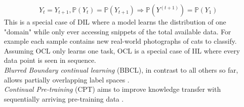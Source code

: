 \begin{equation}
	Y_t=Y_{t+1}, \mathbb{P}(Y_t) = \mathbb{P}(Y_{t+1}) \Rightarrow \mathbb{P}(Y^{(t+1)})=\mathbb{P}(Y_1)
\end{equation}
This is a special case of DIL where a model learns the distribution of one "domain" while only ever accessing snippets of the total available data. For example each sample contains new real-world photographs of cats to classify. Assuming OCL only learns one task, OCL is a special case of IIL where every data point is seen in sequence.\\
\textit{Blurred Boundary continual learning} (BBCL), in contrast to all others so far, allows partially overlapping label spaces \cite{bidaki2025,LW}.\\
\textit{Continual Pre-training} (CPT) aims to improve knowledge transfer with sequentially arriving pre-training data \cite{bidaki2025, LW}.